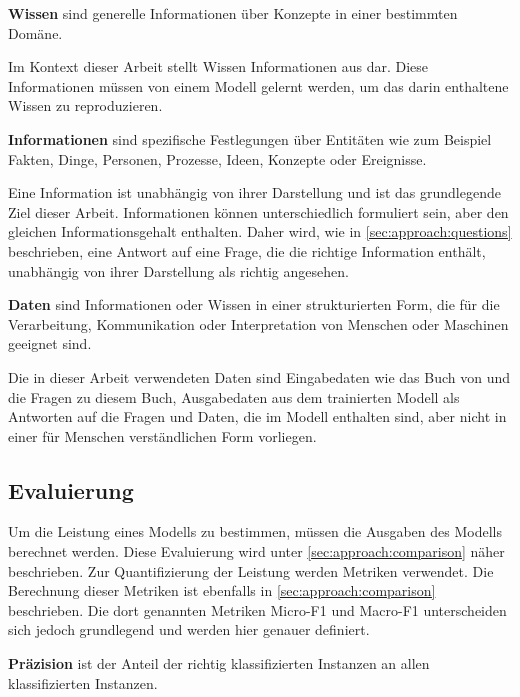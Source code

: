 \begin{definition}\label{def:wissen}
    \textbf{Wissen} sind generelle Informationen über Konzepte in einer bestimmten Domäne.
\end{definition}
Im Kontext dieser Arbeit stellt Wissen Informationen aus \citet{bb} dar.
Diese Informationen müssen von einem Modell gelernt werden, um das darin enthaltene Wissen zu reproduzieren.

\begin{definition}\label{def:information}
    \textbf{Informationen} sind spezifische Festlegungen über Entitäten wie zum Beispiel Fakten, Dinge, Personen, Prozesse, Ideen, Konzepte oder Ereignisse.
\end{definition}
Eine Information ist unabhängig von ihrer Darstellung und ist das grundlegende Ziel dieser Arbeit.
Informationen können unterschiedlich formuliert sein, aber den gleichen Informationsgehalt enthalten.
Daher wird, wie in \cref{sec:approach:questions} beschrieben, eine Antwort auf eine Frage, die die richtige Information enthält, unabhängig von ihrer Darstellung als richtig angesehen.

\begin{definition}\label{def:daten}
    \textbf{Daten} sind Informationen oder Wissen in einer strukturierten Form, die für die Verarbeitung, Kommunikation oder Interpretation von Menschen oder Maschinen geeignet sind.
\end{definition}
Die in dieser Arbeit verwendeten Daten sind Eingabedaten wie das Buch von \citet{bb} und die Fragen zu diesem Buch, Ausgabedaten aus dem trainierten Modell
als Antworten auf die Fragen und Daten, die im Modell enthalten sind, aber nicht in einer für Menschen verständlichen Form vorliegen.


\subsection{Evaluierung}
Um die Leistung eines Modells zu bestimmen, müssen die Ausgaben des Modells berechnet werden.
Diese Evaluierung wird unter \cref{sec:approach:comparison} näher beschrieben.
Zur Quantifizierung der Leistung werden Metriken verwendet.
Die Berechnung dieser Metriken ist ebenfalls in \cref{sec:approach:comparison} beschrieben.
Die dort genannten Metriken Micro-F1 und Macro-F1 unterscheiden sich jedoch grundlegend und werden hier genauer definiert.

\begin{definition}
    \textbf{Präzision} ist der Anteil der richtig klassifizierten Instanzen an allen klassifizierten Instanzen.
\end{definition}

